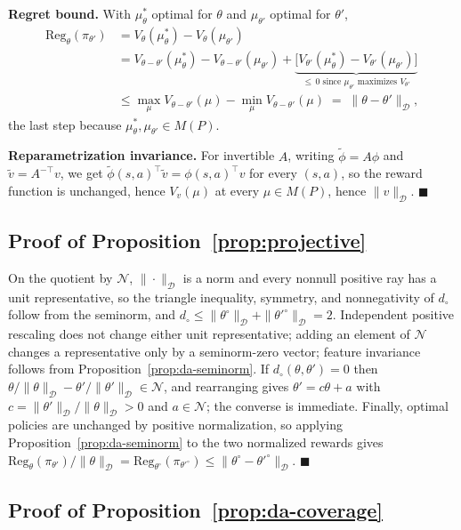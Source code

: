 \documentclass{article}
\newcommand{\Dnorm}[1]{\|#1\|_{\mathcal D}}
\begin{document}
\textbf{Regret bound.} With $\mu^*_\theta$ optimal for $\theta$ and
$\mu_{\theta'}$ optimal for $\theta'$,
\begin{align*}
\mathrm{Reg}_\theta(\pi_{\theta'})
&= V_\theta(\mu^*_\theta) - V_\theta(\mu_{\theta'}) \\
&= V_{\theta-\theta'}(\mu^*_\theta) - V_{\theta-\theta'}(\mu_{\theta'})
  + \underbrace{\big[V_{\theta'}(\mu^*_\theta)-V_{\theta'}(\mu_{\theta'})\big]}_{\le\,0
  \text{ since $\mu_{\theta'}$ maximizes }V_{\theta'}} \\
&\le \max_\mu V_{\theta-\theta'}(\mu) - \min_\mu V_{\theta-\theta'}(\mu)
\;=\; \Dnorm{\theta-\theta'},
\end{align*}
the last step because $\mu^*_\theta,\mu_{\theta'}\in M(P)$.

\textbf{Reparametrization invariance.} For invertible $A$, writing
$\tilde\phi=A\phi$ and $\tilde v=A^{-\top}v$, we get
$\tilde\phi(s,a)^\top\tilde v=\phi(s,a)^\top v$ for every $(s,a)$, so the reward
function is unchanged, hence $V_v(\mu)$ at every $\mu\in M(P)$, hence
$\Dnorm{v}$. $\blacksquare$

\subsection{Proof of Proposition~\ref{prop:projective}}

On the quotient by $\mathcal N$, $\Dnorm{\cdot}$ is a norm and every nonnull
positive ray has a unit representative, so the triangle inequality, symmetry,
and nonnegativity of $d_\circ$ follow from the seminorm, and
$d_\circ\le\Dnorm{\theta^\circ}+\Dnorm{\theta'^\circ}=2$. Independent positive
rescaling does not change either unit representative; adding an element of
$\mathcal N$ changes a representative only by a seminorm-zero vector; feature
invariance follows from Proposition~\ref{prop:da-seminorm}. If
$d_\circ(\theta,\theta')=0$ then
$\theta/\Dnorm{\theta}-\theta'/\Dnorm{\theta'}\in\mathcal N$, and rearranging
gives $\theta'=c\theta+a$ with $c=\Dnorm{\theta'}/\Dnorm{\theta}>0$ and
$a\in\mathcal N$; the converse is immediate. Finally, optimal policies are
unchanged by positive normalization, so applying
Proposition~\ref{prop:da-seminorm} to the two normalized rewards gives
$\mathrm{Reg}_{\theta}(\pi_{\theta'})/\Dnorm{\theta}
=\mathrm{Reg}_{\theta^\circ}(\pi_{\theta'^\circ})
\le\Dnorm{\theta^\circ-\theta'^\circ}$. $\blacksquare$

\subsection{Proof of Proposition~\ref{prop:da-coverage}}
\label{app:proof-da-coverage}
\end{document}

